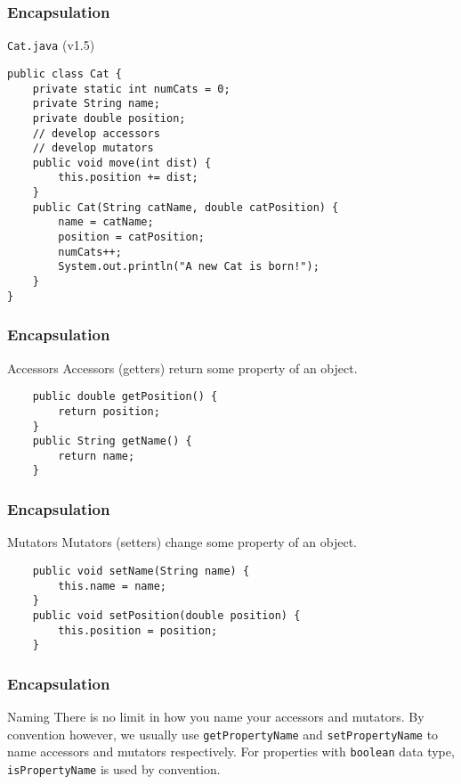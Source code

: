 \documentclass[10pt, compress]{beamer}
\begin{document}
\begin{frame}[fragile]
	\frametitle{Encapsulation}
	\begin{block}{\texttt{Cat.java} (v1.5)}
		\begin{verbatim}
public class Cat {
	private static int numCats = 0;
	private String name;
	private double position;
	// develop accessors
	// develop mutators
	public void move(int dist) {
		this.position += dist;
	}
	public Cat(String catName, double catPosition) {
		name = catName;
		position = catPosition;
		numCats++;
		System.out.println("A new Cat is born!");
	}
}
		\end{verbatim}
	\end{block}
\end{frame}

\begin{frame}[fragile]
	\frametitle{Encapsulation}
	\begin{block}{Accessors}
	Accessors (getters) return some property of an object.
		\begin{verbatim}
	public double getPosition() {
		return position;
	}
	public String getName() {
		return name;
	}
		\end{verbatim}
	\end{block}
\end{frame}

\begin{frame}[fragile]
	\frametitle{Encapsulation}
	\begin{block}{Mutators}
	Mutators (setters) change some property of an object.
		\begin{verbatim}
	public void setName(String name) {
		this.name = name;
	}
	public void setPosition(double position) {
		this.position = position;
	}
		\end{verbatim}
	\end{block}
\end{frame}

\begin{frame}[fragile]
	\frametitle{Encapsulation}
	\begin{block}{Naming}
	There is no limit in how you name your accessors and mutators. By convention however, we usually use \texttt{getPropertyName} and \texttt{setPropertyName} to name accessors and mutators respectively. For properties with \texttt{boolean} data type, \texttt{isPropertyName} is used by convention.
	\end{block}
\end{frame}
\end{document}
